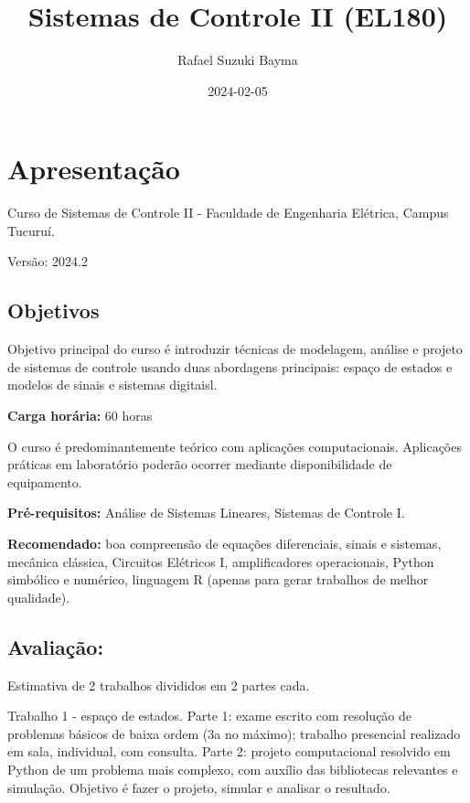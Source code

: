 \documentclass[
]{book}
\title{Sistemas de Controle II (EL180)}
\author{Rafael Suzuki Bayma}
\date{2024-02-05}
\begin{document}
\maketitle

{
\setcounter{tocdepth}{1}
\tableofcontents
}
\hypertarget{apresentauxe7uxe3o}{%
\chapter{Apresentação}\label{apresentauxe7uxe3o}}

Curso de Sistemas de Controle II - Faculdade de Engenharia Elétrica, Campus Tucuruí.

Versão: 2024.2

\hypertarget{objetivos}{%
\section{Objetivos}\label{objetivos}}

Objetivo principal do curso é introduzir técnicas de modelagem, análise e projeto de sistemas de controle usando duas abordagens principais: espaço de estados e modelos de sinais e sistemas digitaisl.

\textbf{Carga horária:} 60 horas

O curso é predominantemente teórico com aplicações computacionais. Aplicações práticas em laboratório poderão ocorrer mediante disponibilidade de equipamento.

\textbf{Pré-requisitos:} Análise de Sistemas Lineares, Sistemas de Controle I.

\textbf{Recomendado:} boa compreensão de equações diferenciais, sinais e sistemas, mecânica clássica, Circuitos Elétricos I, amplificadores operacionais, Python simbólico e numérico, linguagem R (apenas para gerar trabalhos de melhor qualidade).

\hypertarget{avaliauxe7uxe3o}{%
\section{\texorpdfstring{\textbf{Avaliação:}}{Avaliação:}}\label{avaliauxe7uxe3o}}

Estimativa de 2 trabalhos divididos em 2 partes cada.

Trabalho 1 - espaço de estados. Parte 1: exame escrito com resolução de problemas básicos de baixa ordem (3a no máximo); trabalho presencial realizado em sala, individual, com consulta. Parte 2: projeto computacional resolvido em Python de um problema mais complexo, com auxílio das bibliotecas relevantes e simulação. Objetivo é fazer o projeto, simular e analisar o resultado.
\end{document}
